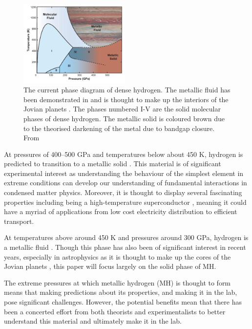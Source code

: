 \documentclass[esp]{FCEFyN-class}
\begin{document}
\begin{figure}[H]
    \centering
    \includegraphics[width=0.49\textwidth]{phasediagram.pdf}
    \caption{The current phase diagram of dense hydrogen. The metallic fluid has been demonstrated in \cite{knudson2015} and is thought to make up the interiors of the Jovian planets \cite{ashcroft1968metallic}. The phases numbered I-V are the solid molecular phases of dense hydrogen. The metallic solid is coloured brown due to the theorised darkening of the metal due to bandgap closure. From \cite{gregoryanz2020}}
    \label{fig:phasediag}
\end{figure}
\vspace{3mm} %


At pressures of 400--500 GPa and temperatures below about 450 K, hydrogen is predicted to transition to a metallic solid \cite{Wigner1935}. This material is of significant experimental interest as understanding the behaviour of the simplest element in extreme conditions can develop our understanding of fundamental interactions in condensed matter physics. Moreover, it is thought to display several fascinating properties including being a high-temperature superconductor \cite{ashcroft1968metallic}, meaning it could have a myriad of applications from low cost electricity distribution to efficient transport.

At temperatures above around 450 K and pressures around 300 GPa, hydrogen is a metallic fluid \cite{knudson2015}. Though this phase has also been of significant interest in recent years, especially in astrophysics as it is thought to make up the cores of the Jovian planets \cite{ashcroft1968metallic}, this paper will focus largely on the solid phase of MH.

The extreme pressures at which metallic hydrogen (MH) is thought to form means that making predictions about its properties, and making it in the lab, pose significant challenges. However, the potential benefits mean that there has been a concerted effort from both theorists and experimentalists to better understand this material and ultimately make it in the lab.
\end{document}

